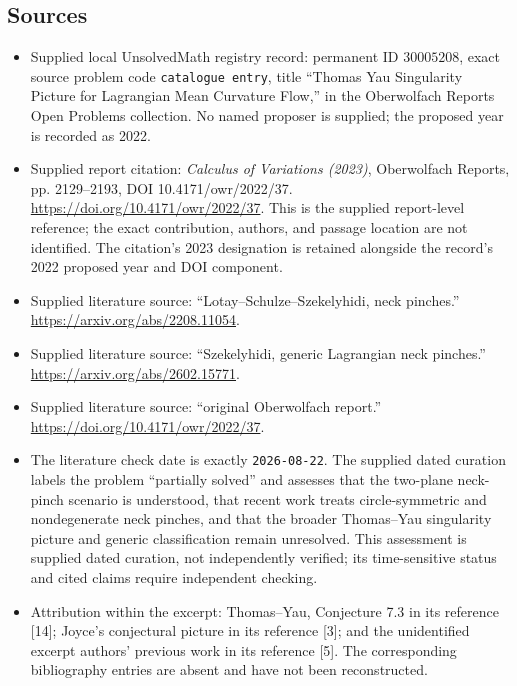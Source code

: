\documentclass[11pt]{article}
\begin{document}
\subsection{Sources}
\begin{itemize}
\item Supplied local UnsolvedMath registry record: permanent ID \(30005208\), exact source problem code \texttt{catalogue entry}, title ``Thomas Yau Singularity Picture for Lagrangian Mean Curvature Flow,'' in the Oberwolfach Reports Open Problems collection. No named proposer is supplied; the proposed year is recorded as 2022.
\item Supplied report citation: \emph{Calculus of Variations (2023)}, Oberwolfach Reports, pp. 2129--2193, DOI 10.4171/owr/2022/37. \url{https://doi.org/10.4171/owr/2022/37}. This is the supplied report-level reference; the exact contribution, authors, and passage location are not identified. The citation's 2023 designation is retained alongside the record's 2022 proposed year and DOI component.
\item Supplied literature source: ``Lotay--Schulze--Szekelyhidi, neck pinches.'' \url{https://arxiv.org/abs/2208.11054}.
\item Supplied literature source: ``Szekelyhidi, generic Lagrangian neck pinches.'' \url{https://arxiv.org/abs/2602.15771}.
\item Supplied literature source: ``original Oberwolfach report.'' \url{https://doi.org/10.4171/owr/2022/37}.
\item The literature check date is exactly \texttt{2026-08-22}. The supplied dated curation labels the problem ``partially solved'' and assesses that the two-plane neck-pinch scenario is understood, that recent work treats circle-symmetric and nondegenerate neck pinches, and that the broader Thomas--Yau singularity picture and generic classification remain unresolved. This assessment is supplied dated curation, not independently verified; its time-sensitive status and cited claims require independent checking.
\item Attribution within the excerpt: Thomas--Yau, Conjecture 7.3 in its reference [14]; Joyce's conjectural picture in its reference [3]; and the unidentified excerpt authors' previous work in its reference [5]. The corresponding bibliography entries are absent and have not been reconstructed.
\end{itemize}
\end{document}
